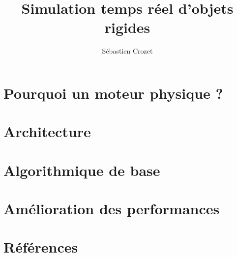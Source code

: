 \documentclass{beamer}
\title{Simulation temps réel d'objets rigides}
\author{Sébastien Crozet}
\begin{document}
\maketitle

\section{Pourquoi un moteur physique ?}

\section{Architecture}

\section{Algorithmique de base}

\section{Amélioration des performances}

\section{Références}
\end{document}
